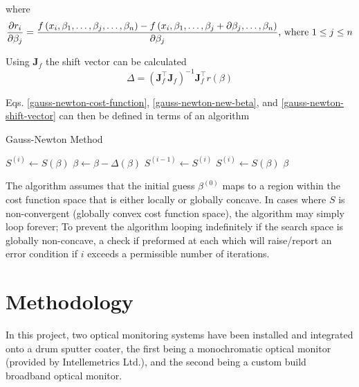 \documentclass[10pt,a4paper,portrait]{report}
\begin{document}
\noindent
where
\begin{equation}
\notag
\frac{\partial r_i}{\partial \beta_j} =
\frac{f\left(x_i, \beta_1, \ldots, \beta_j, \ldots, \beta_n\right) - f\left(x_i, \beta_1, \ldots, \beta_j+\partial\beta_j, \ldots, \beta_n\right)}{\partial\beta_j}
\mbox{,    where    } 1 \leq j \leq n
\end{equation}

\noindent
Using $\mathbf{J}_f$ the shift vector can be calculated
\begin{equation}
\label{gauss-newton-shift-vector}
\Delta = \left( \mathbf{J}_{f}^{\intercal} \mathbf{J}_f \right)^{-1} \mathbf{J}_f^{\intercal} r \left( \beta \right)
\end{equation}

\noindent
Eqs. \ref{gauss-newton-cost-function}, \ref{gauss-newton-new-beta}, and \ref{gauss-newton-shift-vector} can then be defined in terms of an algorithm


\begin{algorithm}
\caption{Gauss-Newton Method}\label{gauss-newton-method}
\begin{algorithmic}[1]
\State $S^{(i)} \gets S\left( \beta \right)$
\Loop
\State $\beta \gets \beta - \Delta(\beta)$
\State $S^{(i-1)} \gets S^{(i)}$
\State $S^{(i)} \gets S\left(\beta\right)$
\State \Return $\beta$
\EndIf
\EndLoop
\EndProcedure
\end{algorithmic}
\end{algorithm}

\noindent
The algorithm assumes that the initial guess $\beta^{(0)}$ maps to a region within the cost function space that is either locally or globally concave. In cases where $S$ is non-convergent (globally convex cost function space), the algorithm may simply loop forever; To prevent the algorithm looping indefinitely if the search space is globally non-concave, a check if preformed at each which will raise/report an error condition if $i$ exceeds a permissible number of iterations.

\chapter{Methodology}

In this project, two optical monitoring systems have been installed and integrated onto a drum sputter coater, the first being a monochromatic optical monitor (provided by Intellemetrics Ltd.), and the second being a custom build broadband optical monitor. 
\end{document}
